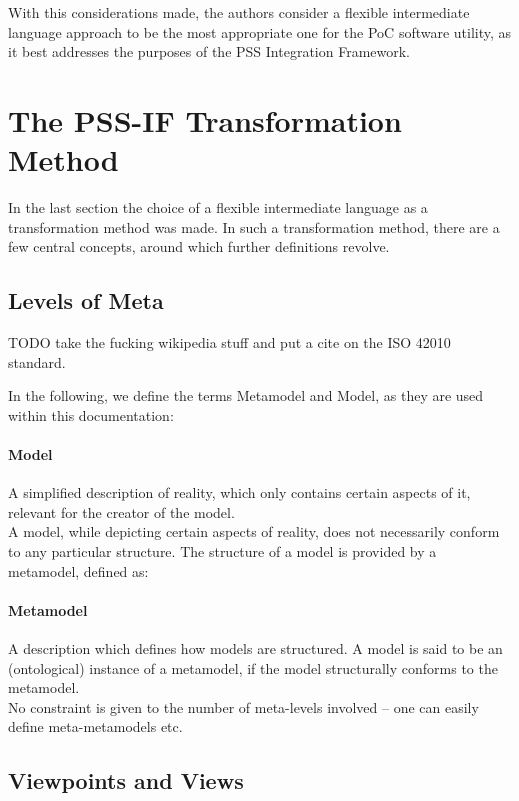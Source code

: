 With this considerations made, the authors consider a flexible intermediate language approach to be the most appropriate one for the PoC software utility, as it best addresses the purposes of the PSS Integration Framework.

\section{The PSS-IF Transformation Method}
\label{sec:approach:pssif}

In the last section the choice of a flexible intermediate language as a transformation method was made. In such a transformation method, there are a few central concepts, around which further definitions revolve.

\subsection{Levels of Meta}

TODO take the fucking wikipedia stuff and put a cite on the ISO 42010 standard.

In the following, we define the terms Metamodel and Model, as they are used within this documentation:

\paragraph{Model} A simplified description of reality, which only contains certain aspects of it, relevant for the creator of the model.\\

A model, while depicting certain aspects of reality, does not necessarily conform to any particular structure. The structure of a model is provided by a metamodel, defined as:

\paragraph{Metamodel} A description which defines how models are structured. A model is said to be an (ontological) instance of a metamodel, if the model structurally conforms to the metamodel.\\

No constraint is given to the number of meta-levels involved -- one can easily define meta-metamodels etc.

\subsection{Viewpoints and Views}

